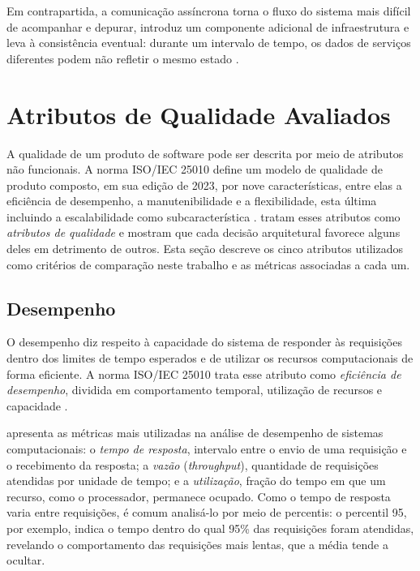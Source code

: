 Em contrapartida, a comunicação assíncrona torna o fluxo do sistema mais difícil de
acompanhar e depurar, introduz um componente adicional de infraestrutura e leva à
consistência eventual: durante um intervalo de tempo, os dados de serviços diferentes podem
não refletir o mesmo estado \cite{richardson2018}.

\section{Atributos de Qualidade Avaliados}

A qualidade de um produto de software pode ser descrita por meio de atributos não funcionais.
A norma ISO/IEC 25010 define um modelo de qualidade de produto composto, em sua edição de 2023,
por nove características, entre elas a eficiência de desempenho, a manutenibilidade e a
flexibilidade, esta última incluindo a escalabilidade como subcaracterística
\cite{iso25010}.  tratam esses atributos como \textit{atributos de
qualidade} e mostram que cada decisão arquitetural favorece alguns deles em detrimento de
outros. Esta seção descreve os cinco atributos utilizados como critérios de comparação neste
trabalho e as métricas associadas a cada um.

\subsection{Desempenho}

O desempenho diz respeito à capacidade do sistema de responder às requisições dentro dos
limites de tempo esperados e de utilizar os recursos computacionais de forma eficiente. A
norma ISO/IEC 25010 trata esse atributo como \textit{eficiência de desempenho}, dividida em
comportamento temporal, utilização de recursos e capacidade \cite{iso25010}.

 apresenta as métricas mais utilizadas na análise de desempenho de
sistemas computacionais: o \textit{tempo de resposta}, intervalo entre o envio de uma
requisição e o recebimento da resposta; a \textit{vazão} (\textit{throughput}), quantidade de
requisições atendidas por unidade de tempo; e a \textit{utilização}, fração do tempo em que um
recurso, como o processador, permanece ocupado. Como o tempo de resposta varia entre
requisições, é comum analisá-lo por meio de percentis: o percentil 95, por exemplo, indica o
tempo dentro do qual 95\% das requisições foram atendidas, revelando o comportamento das
requisições mais lentas, que a média tende a ocultar.

